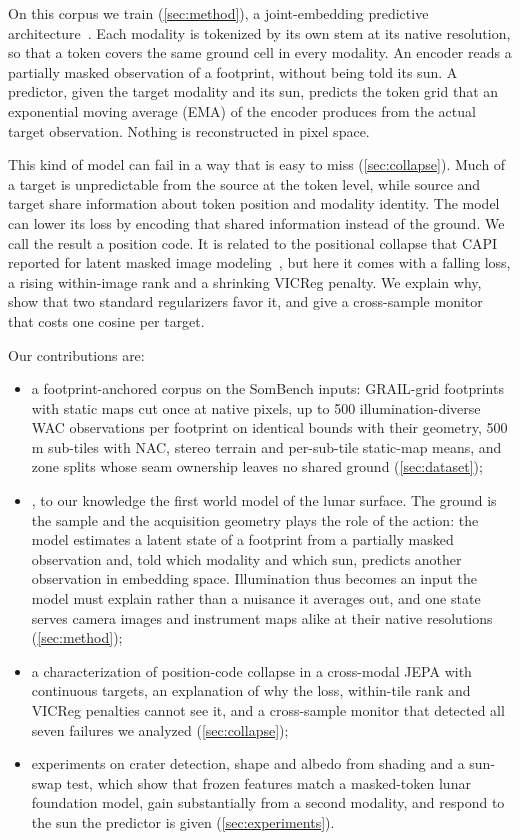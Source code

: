 On this corpus we train \method (\cref{sec:method}), a joint-embedding predictive architecture~\cite{assran2023self,bardes2024revisiting}. Each modality is tokenized by its own stem at its native resolution, so that a token covers the same ground cell in every modality. An encoder reads a partially masked observation of a footprint, without being told its sun. A predictor, given the target modality and its sun, predicts the token grid that an exponential moving average (EMA) of the encoder produces from the actual target observation. Nothing is reconstructed in pixel space.

This kind of model can fail in a way that is easy to miss (\cref{sec:collapse}). Much of a target is unpredictable from the source at the token level, while source and target share information about token position and modality identity. The model can lower its loss by encoding that shared information instead of the ground. We call the result a position code. It is related to the positional collapse that CAPI reported for latent masked image modeling~\cite{darcet2025cluster}, but here it comes with a falling loss, a rising within-image rank and a shrinking VICReg penalty. We explain why, show that two standard regularizers favor it, and give a cross-sample monitor that costs one cosine per target.

Our contributions are:
\begin{itemize}
  \item a footprint-anchored corpus on the SomBench inputs: GRAIL-grid footprints with static maps cut once at native pixels, up to 500 illumination-diverse WAC observations per footprint on identical bounds with their geometry, 500\,m sub-tiles with NAC, stereo terrain and per-sub-tile static-map means, and zone splits whose seam ownership leaves no shared ground (\cref{sec:dataset});
  \item \method, to our knowledge the first world model of the lunar surface. The ground is the sample and the acquisition geometry plays the role of the action: the model estimates a latent state of a footprint from a partially masked observation and, told which modality and which sun, predicts another observation in embedding space. Illumination thus becomes an input the model must explain rather than a nuisance it averages out, and one state serves camera images and instrument maps alike at their native resolutions (\cref{sec:method});
  \item a characterization of position-code collapse in a cross-modal JEPA with continuous targets, an explanation of why the loss, within-tile rank and VICReg penalties cannot see it, and a cross-sample monitor that detected all seven failures we analyzed (\cref{sec:collapse});
  \item experiments on crater detection, shape and albedo from shading and a sun-swap test, which show that frozen features match a masked-token lunar foundation model, gain substantially from a second modality, and respond to the sun the predictor is given (\cref{sec:experiments}).
\end{itemize}
